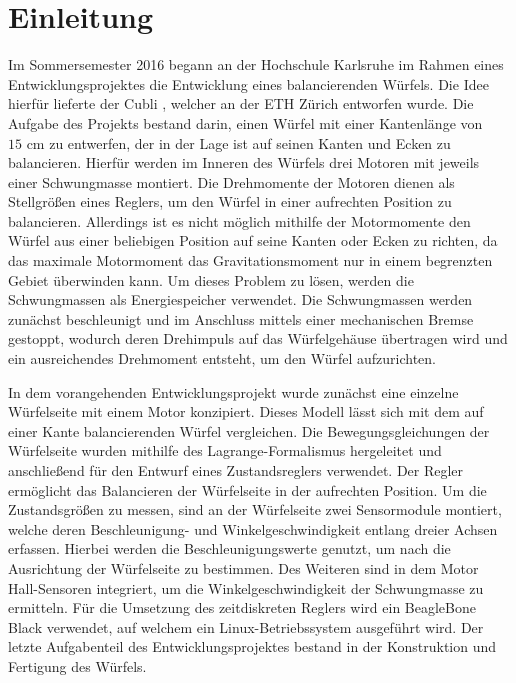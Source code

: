 \chapter{Einleitung}
Im Sommersemester 2016 begann an der Hochschule Karlsruhe im Rahmen eines Entwicklungsprojektes die Entwicklung eines balancierenden Würfels. Die Idee hierfür lieferte der Cubli \cite{Cubli1}, welcher an der ETH Zürich entworfen wurde. Die Aufgabe des Projekts bestand darin, einen Würfel mit einer Kantenlänge von $15\text{ cm}$ zu entwerfen, der in der Lage ist auf seinen Kanten und Ecken zu balancieren. Hierfür werden im Inneren des Würfels drei Motoren mit jeweils einer Schwungmasse montiert. Die Drehmomente der Motoren dienen als Stellgrößen eines Reglers, um den Würfel in einer aufrechten Position zu balancieren. Allerdings ist es nicht möglich mithilfe der Motormomente den Würfel aus einer beliebigen Position auf seine Kanten oder Ecken zu richten, da das maximale Motormoment das Gravitationsmoment nur in einem begrenzten Gebiet überwinden kann. Um dieses Problem zu lösen, werden die Schwungmassen als Energiespeicher verwendet. Die Schwungmassen werden zunächst beschleunigt und im Anschluss mittels einer mechanischen Bremse gestoppt, wodurch deren Drehimpuls auf das Würfelgehäuse übertragen wird und ein ausreichendes Drehmoment entsteht, um den Würfel aufzurichten.

In dem vorangehenden Entwicklungsprojekt wurde zunächst eine einzelne Würfelseite mit einem Motor konzipiert. Dieses Modell lässt sich mit dem auf einer Kante balancierenden Würfel vergleichen. Die Bewegungsgleichungen der Würfelseite wurden mithilfe des Lagrange-Formalismus hergeleitet und anschließend für den Entwurf eines Zustandsreglers verwendet. Der Regler ermöglicht das Balancieren der Würfelseite in der aufrechten Position. Um die Zustandsgrößen zu messen, sind an der Würfelseite zwei Sensormodule montiert, welche deren Beschleunigung- und Winkelgeschwindigkeit entlang dreier Achsen erfassen. Hierbei werden die Beschleunigungswerte genutzt, um nach \cite{Cubli1} die Ausrichtung der Würfelseite zu bestimmen. Des Weiteren sind in dem Motor Hall-Sensoren integriert, um die Winkelgeschwindigkeit der Schwungmasse zu ermitteln. Für die Umsetzung des zeitdiskreten Reglers wird ein BeagleBone Black verwendet, auf welchem ein Linux-Betriebssystem ausgeführt wird. Der letzte Aufgabenteil des Entwicklungsprojektes bestand in der Konstruktion und Fertigung des Würfels.

